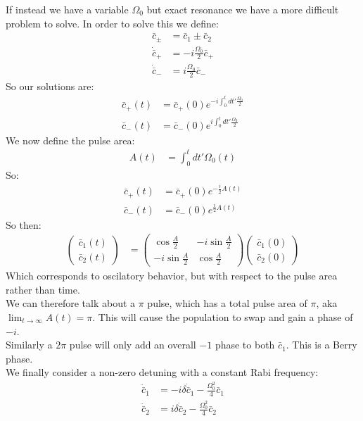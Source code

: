 If instead we have a variable $\Omega_0$ but exact resonance we have a more difficult problem to solve. In order to solve this we define:
\begin{align*}
	\bar{c}_\pm &= \bar{c}_1 \pm \bar{c}_2 \\
	\dot{\bar{c}}_+ &= -i\frac{\Omega_0}{2} \bar{c}_+ \\
	\dot{\bar{c}}_- &= i\frac{\Omega_0}{2} \bar{c}_-
\end{align*}
So our solutions are:
\begin{align*}
	\bar{c}_+(t) &= \bar{c}_+(0) e^{-i\int_0^t dt' \frac{\Omega_0}{2}} \\
	\bar{c}_-(t) &= \bar{c}_-(0) e^{i\int_0^t dt' \frac{\Omega_0}{2}}
\end{align*}
We now define the pulse area:
\begin{align*}
	A(t) &= \int_0^t dt' \Omega_0(t)
\end{align*}
So:
\begin{align*}
	\bar{c}_+(t) &= \bar{c}_+(0) e^{-\frac{i}{2}A(t)} \\
	\bar{c}_-(t) &= \bar{c}_-(0) e^{\frac{i}{2}A(t)}
\end{align*}
So then:
\begin{align*}
	\begin{pmatrix}
		\bar{c}_1(t) \\
		\bar{c}_2(t)
	\end{pmatrix} &= \begin{pmatrix}
	\cos\frac{A}{2} & -i\sin\frac{A}{2} \\
	-i\sin\frac{A}{2} & \cos\frac{A}{2}
		  \end{pmatrix}
		  \begin{pmatrix}
			  \bar{c}_1(0) \\
			  \bar{c}_2(0)
    \end{pmatrix}
\end{align*}
Which corresponds to oscilatory behavior, but with respect to the pulse area rather than time.\\
We can therefore talk about a $\pi$ pulse, which has a total pulse area of $\pi$, aka $\lim_{t\to\infty} A(t) = \pi$. This will cause the population to swap and gain a phase of $-i$.\\
Similarly a $2\pi$ pulse will only add an overall $-1$ phase to both $\bar{c}_1$. This is a Berry phase. \\
We finally consider a non-zero detuning with a constant Rabi frequency:
\begin{align*}
	\ddot{\bar{c}}_1 &= -i\delta\dot{\bar{c}}_1  - \frac{\Omega_0^2}{4} \bar{c}_1 \\
\ddot{\bar{c}}_2 &= i\delta\dot{\bar{c}}_2  - \frac{\Omega_0^2}{4} \bar{c}_2
\end{align*}
